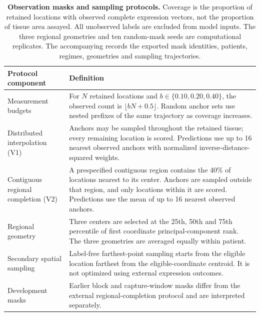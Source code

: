 \begin{table}[htbp]
\caption{\textbf{Observation masks and sampling protocols.} Coverage is the proportion of retained locations with observed complete expression vectors, not the proportion of tissue area assayed. All unobserved labels are excluded from model inputs. The three regional geometries and ten random-mask seeds are computational replicates. The accompanying \protect{} records the exported mask identities, patients, regimes, geometries and sampling trajectories.}
\label{tab:s6}
\centering\small
\begin{tabularx}{\textwidth}{>{\RaggedRight\arraybackslash}p{}Y}\toprule
Protocol component & Definition\\\midrule
Measurement budgets & For $N$ retained locations and $b\in\{0.10, 0.20, 0.40\}$, the observed count is $\lfloor bN+0.5\rfloor$. Random anchor sets use nested prefixes of the same trajectory as coverage increases.\\
Distributed interpolation (V1) & Anchors may be sampled throughout the retained tissue; every remaining location is scored. Predictions use up to 16 nearest observed anchors with normalized inverse-distance-squared weights.\\
Contiguous regional completion (V2) & A prespecified contiguous region contains the 40\% of locations nearest to its center. Anchors are sampled outside that region, and only locations within it are scored. Predictions use the mean of up to 16 nearest observed anchors.\\
Regional geometry & Three centers are selected at the 25th, 50th and 75th percentile of first coordinate principal-component rank. The three geometries are averaged equally within patient.\\
Secondary spatial sampling & Label-free farthest-point sampling starts from the eligible location farthest from the eligible-coordinate centroid. It is not optimized using external expression outcomes.\\
Development masks & Earlier block and capture-window masks differ from the external regional-completion protocol and are interpreted separately.\\
\bottomrule\end{tabularx}
\end{table}\clearpage
